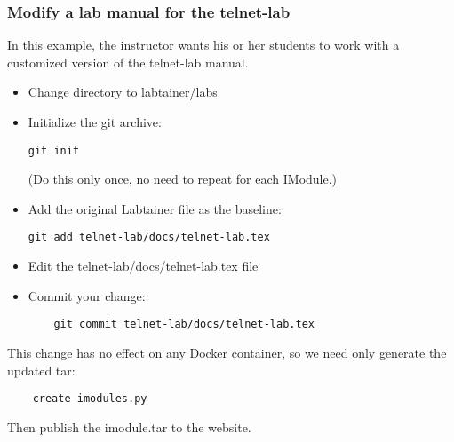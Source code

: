 \documentclass[12pt]{article}
\begin{document}
\subsubsection {Modify a lab manual for the telnet-lab}
In this example, the instructor wants his or her students to work with a customized version
of the telnet-lab manual.  
\begin{itemize}
\item Change directory to labtainer/labs
\item Initialize the git archive: 
\begin{verbatim}
git init  
\end{verbatim}
\noindent (Do this only once, no need to repeat for each IModule.)
\item Add the original Labtainer file as the baseline: 

\begin{verbatim}
git add telnet-lab/docs/telnet-lab.tex
\end{verbatim}
\item Edit the telnet-lab/docs/telnet-lab.tex file
\item Commit your change: 
\begin{verbatim}
    git commit telnet-lab/docs/telnet-lab.tex
\end{verbatim}
\end{itemize}

This change has no effect on any Docker container, so we need only generate the 
updated tar:
\begin{verbatim}
    create-imodules.py
\end{verbatim}

\noindent Then publish the imodule.tar to the website.
\end{document}
